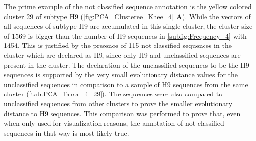 \begin{table}[!hbt]
    \centering
    \caption[Unclassified sequences in segment 4 cluster 29 with PK]{\textbf{Unclassified sequences in segment 4 cluster 29 with PK.} The \glspl{MSA} mean distance of the given sequences in comparison to a sample of H9 sequences of the same cluster and a sample of unclassified sequences present in other clusters. Only the first 20 columns are presented here, the full table can be found in the projects GitHub Repository\footnotemark.}
    \label{tab:PCA_Error_4_29}
\end{table}

The prime example of the not classified sequence annotation is the yellow colored cluster 29 of subtype H9 (\autoref{fig:PCA_Clusteree_Knee_4} \textbf{\textsf{A}}). While the vectors of all sequences of subtype H9 are accumulated in this single cluster, the cluster size of 1569 is bigger than the number of H9 sequences in \autoref{subfig:Frequency_4} with 1454. This is justified by the presence of 115 not classified sequences in the cluster which are declared as H9, since only H9 and unclassified sequences are present in the cluster. The declaration of the unclassified sequences to be the H9 sequences is supported by the very small evolutionary distance values for the unclassified sequences in comparison to a sample of H9 sequences from the same cluster (\autoref{tab:PCA_Error_4_29}). The sequences were also compared to unclassified sequences from other clusters to prove the smaller evolutionary distance to H9 sequences. This comparison was performed to prove that, even when only used for visualization reasons, the annotation of not classified sequences in that way is most likely true.

